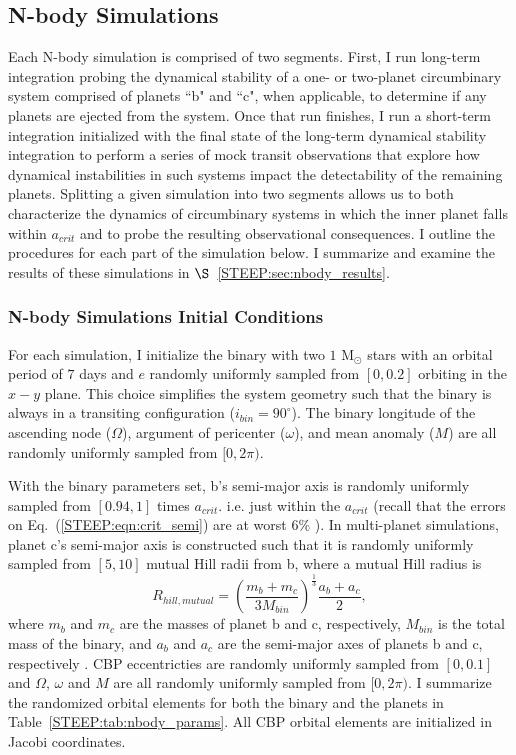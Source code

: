 \subsection{N-body Simulations}

Each N-body simulation is comprised of two segments.  First, I run long-term integration probing the dynamical stability of a one- or two-planet circumbinary system comprised of planets ``b" and ``c", when applicable, to determine if any planets are ejected from the system.  Once that run finishes, I run a short-term integration initialized with the final state of the long-term dynamical stability integration to perform a series of mock transit observations that explore how dynamical instabilities in such systems impact the detectability of the remaining planets.  Splitting a given simulation into two segments allows us to both characterize the dynamics of circumbinary systems in which the inner planet falls within $a_{crit}$ and to probe the resulting observational consequences.  I outline the procedures for each part of the simulation below.  I summarize and examine the results of these simulations in $\S$~\ref{STEEP:sec:nbody_results}.

\subsubsection{N-body Simulations Initial Conditions} \label{STEEP:sec:nbody_initial_conditions}

For each simulation, I initialize the binary with two $1$ M$_{\odot}$ stars with an orbital period of $7$ days and $e$ randomly uniformly sampled from $[0,0.2]$ orbiting in the $x-y$ plane.  This choice simplifies the system geometry such that the binary is always in a transiting configuration ($i_{bin} = 90^{\circ}$).  The binary longitude of the ascending node ($\Omega$), argument of pericenter ($\omega$), and mean anomaly ($M$) are all randomly uniformly sampled from $[0,2\pi)$.

With the binary parameters set, b's semi-major axis is randomly uniformly sampled from $[0.94,1]$ times $a_{crit}$. i.e. just within the $a_{crit}$ (recall that the errors on Eq.~(\ref{STEEP:eqn:crit_semi}) are at worst $6\%$ \citep{Holman1999}).  In multi-planet simulations, planet c's semi-major axis is constructed such that it is randomly uniformly sampled from $[5,10]$ mutual Hill radii from b, where a mutual Hill radius is
\begin{equation} \label{STEEP:eqn:mutual_hill_radius}
R_{hill, mutual} = \left( \frac{m_b + m_c}{3M_{bin}} \right)^{\frac{1}{3}} \frac{a_b + a_c}{2},
\end{equation}
where $m_b$ and $m_c$ are the masses of planet b and c, respectively, $M_{bin}$ is the total mass of the binary, and $a_b$ and $a_c$ are the semi-major axes of planets b and c, respectively \citep{Chambers1996}.  CBP eccentricties are randomly uniformly sampled from $[0,0.1]$ and $\Omega$, $\omega$ and $M$ are all randomly uniformly sampled from $[0,2\pi)$.  I summarize the randomized orbital elements for both the binary and the planets in Table~\ref{STEEP:tab:nbody_params}.  All CBP orbital elements are initialized in Jacobi coordinates.

